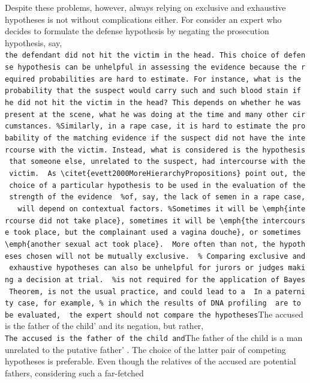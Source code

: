 \documentclass[10pt,dvipsnames,enabledeprecatedfontcommands]{scrartcl}
\begin{document}
Despite these problems, however, always relying on exclusive and
exhaustive hypotheses is not without complications either. For consider
an expert who decides to formulate the defense hypothesis by negating
the prosecution hypothesis, say,
\texttt{the\ defendant\ did\ not\ hit\ the\ victim\ in\ the\ head.\textquotesingle{}\ This\ choice\ of\ defense\ hypothesis\ can\ be\ unhelpful\ in\ assessing\ the\ evidence\ because\ the\ required\ probabilities\ are\ hard\ to\ estimate.\ For\ instance,\ what\ is\ the\ probability\ that\ the\ suspect\ would\ carry\ such\ and\ such\ blood\ stain\ if\ he\ did\ not\ hit\ the\ victim\ in\ the\ head?\ This\ depends\ on\ whether\ he\ was\ present\ at\ the\ scene,\ what\ he\ was\ doing\ at\ the\ time\ and\ many\ other\ circumstances.\ \%Similarly,\ in\ a\ rape\ case,\ it\ is\ hard\ to\ estimate\ the\ probability\ of\ the\ matching\ evidence\ if\ the\ suspect\ did\ not\ have\ the\ intercourse\ with\ the\ victim.\ Instead,\ what\ is\ considered\ is\ the\ hypothesis\ that\ someone\ else,\ unrelated\ to\ the\ suspect,\ had\ intercourse\ with\ the\ victim.\ \ As\ \textbackslash{}citet\{evett2000MoreHierarchyPropositions\}\ point\ out,\ the\ choice\ of\ a\ particular\ hypothesis\ to\ be\ used\ in\ the\ evaluation\ of\ the\ strength\ of\ the\ evidence\ \ \%of,\ say,\ the\ lack\ of\ semen\ in\ a\ rape\ case,\ \ \ will\ depend\ on\ contextual\ factors.\ \%Sometimes\ it\ will\ be\ \textbackslash{}emph\{intercourse\ did\ not\ take\ place\},\ sometimes\ it\ will\ be\ \textbackslash{}emph\{the\ intercourse\ took\ place,\ but\ the\ complainant\ used\ a\ vagina\ douche\},\ or\ sometimes\ \textbackslash{}emph\{another\ sexual\ act\ took\ place\}.\ \ More\ often\ than\ not,\ the\ hypotheses\ chosen\ will\ not\ be\ mutually\ exclusive.\ \ \%\ Comparing\ exclusive\ and\ exhaustive\ hypotheses\ can\ also\ be\ unhelpful\ for\ jurors\ or\ judges\ making\ a\ decision\ at\ trial.\ \ \%is\ not\ required\ for\ the\ application\ of\ Bayes\textquotesingle{}\ Theorem,\ is\ not\ the\ usual\ practice,\ and\ could\ lead\ to\ a\ \ In\ a\ paternity\ case,\ for\ example,\ \%\ in\ which\ the\ results\ of\ DNA\ profiling\ \ are\ to\ be\ evaluated,\ \ the\ expert\ should\ not\ compare\ the\ hypotheses}The
accused is the father of the child' and its negation, but rather,
\texttt{The\ accused\ is\ the\ father\ of\ the\ child\textquotesingle{}\ and}The
father of the child is a man unrelated to the putative father'
\citep{biedermann2014UseLikelihoodRatio}. The choice of the latter pair
of competing hypotheses is preferable. Even though the relatives of the
accused are potential fathers, considering such a far-fetched
\end{document}
